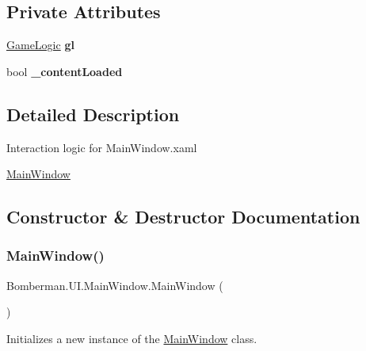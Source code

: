 \subsection*{Private Attributes}
\begin{DoxyCompactItemize}
\item 
\mbox{\label{class_bomberman_1_1_u_i_1_1_main_window_a3760333ca0579b04ebe4c0e4675794ff}} 
\mbox{\hyperlink{class_bomberman_1_1_business_logic_1_1_game_logic}{Game\+Logic}} {\bfseries gl}
\item 
\mbox{\label{class_bomberman_1_1_u_i_1_1_main_window_a7859265f0b0e8c998fc6d5a233bbc6bc}} 
bool {\bfseries \+\_\+content\+Loaded}
\end{DoxyCompactItemize}


\subsection{Detailed Description}
Interaction logic for Main\+Window.\+xaml 

\mbox{\hyperlink{class_bomberman_1_1_u_i_1_1_main_window}{Main\+Window}}

\subsection{Constructor \& Destructor Documentation}
\mbox{\label{class_bomberman_1_1_u_i_1_1_main_window_adb37602062e82ec48718bd3b33c17e69}} 
\subsubsection{\texorpdfstring{MainWindow()}{MainWindow()}}
{\footnotesize\ttfamily Bomberman.\+U\+I.\+Main\+Window.\+Main\+Window (\begin{DoxyParamCaption}{ }\end{DoxyParamCaption})\hspace{0.3cm}{\ttfamily [inline]}}



Initializes a new instance of the \mbox{\hyperlink{class_bomberman_1_1_u_i_1_1_main_window}{Main\+Window}} class. 



